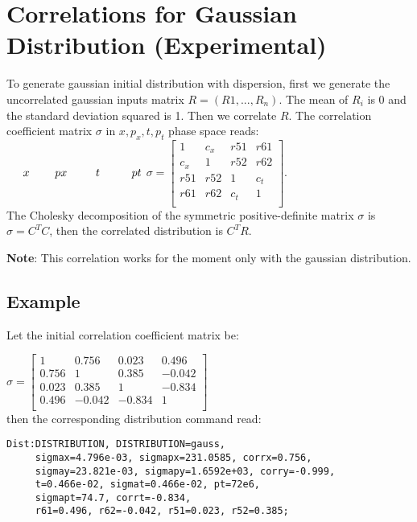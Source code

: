\section{Correlations for Gaussian Distribution (Experimental)}

To generate gaussian initial distribution with dispersion, first we
generate the uncorrelated gaussian inputs matrix $R=(R1,...,R_n)$.
The mean of $R_i$ is $0$ and the standard deviation squared is 1. Then
we correlate $R$.
The correlation coefficient matrix $\sigma$ in $x,p_x,t,p_t$ phase space reads: \\

$ \hspace{0.5cm}x \hspace{0.8cm}  px  \hspace{0.9cm} t\hspace{1.0cm} pt\\$
$\sigma= \left[
\begin{array}{cccc}
1    &c_x&r51    &r61\\
c_x&1    &r52    &r62\\
r51  &r52  &1      &c_t\\
r61  &r62  &c_t  &1\\
\end{array}
\right].$ \\

The Cholesky decomposition of the symmetric positive-definite matrix $\sigma$ is $\sigma=C^TC$, then the correlated distribution is $C^TR$.

\textbf{Note}: This correlation works for the moment only with the gaussian distribution.

\subsection{Example}
Let the initial correlation coefficient matrix be:

$\sigma= \left[
\begin{array}{cccc}
1      &0.756  &0.023    &0.496\\
0.756  &1      &0.385    &-0.042\\
0.023  &0.385  &1        &-0.834\\
0.496  &-0.042 &-0.834   &1\\

\end{array}
\right]$ \\
then the corresponding distribution command read:
\begin{verbatim}
Dist:DISTRIBUTION, DISTRIBUTION=gauss,
     sigmax=4.796e-03, sigmapx=231.0585, corrx=0.756,
     sigmay=23.821e-03, sigmapy=1.6592e+03, corry=-0.999,
     t=0.466e-02, sigmat=0.466e-02, pt=72e6, 
     sigmapt=74.7, corrt=-0.834,
     r61=0.496, r62=-0.042, r51=0.023, r52=0.385;
\end{verbatim}

